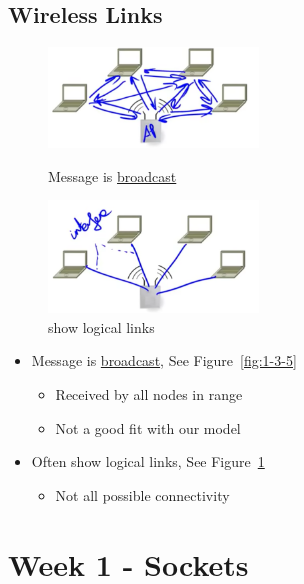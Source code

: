 \documentclass[12pt]{ctexart}   %
\begin{document}
	\subsection{Wireless Links}
	
		\begin{figure}
			\begin{minipage}[t]{0.5\linewidth}
				\centering
				\includegraphics[width=2.2in]{images/1-3-5}
				\caption{Message is \underline{broadcast}}
				\label{fig:1-3-5}
			\end{minipage}
			\begin{minipage}[t]{0.5\linewidth}
				\centering
				\includegraphics[width=2.2in]{images/1-3-6}
				\caption{show logical links}
				\label{fig:1-3-6}
			\end{minipage}
		\end{figure}
		
	\begin{itemize}
	\item Message is \underline{broadcast}, See Figure~\ref{fig:1-3-5}
	\begin{itemize}
		\item Received by all nodes in range
		\item Not a good fit with our model
	\end{itemize}
	
	\item Often show logical links, See Figure~\ref{fig:1-3-6}
	\begin{itemize}
		\item Not all possible connectivity
	\end{itemize}
	\end{itemize}

\section{Week 1 - Sockets}
\end{document}
